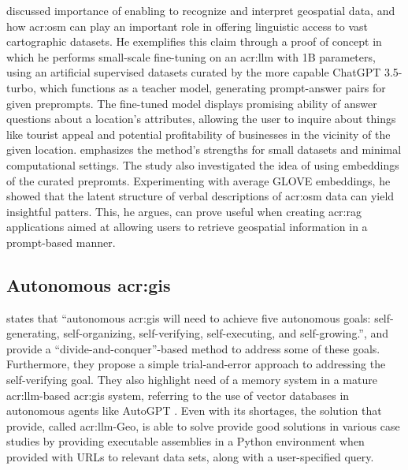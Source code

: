 \cite{unluChatmapLargeLanguage2023} discussed importance of enabling  to recognize and interpret geospatial data, and how \gls{acr:osm} can play an important role in offering  linguistic access to vast cartographic datasets. He exemplifies this claim through a proof of concept in which he performs small-scale fine-tuning on an \acrshort{acr:llm} with 1B parameters, using an artificial supervised datasets curated by the more capable ChatGPT 3.5-turbo, which functions as a teacher model, generating prompt-answer pairs for given preprompts. The fine-tuned model displays promising ability of answer questions about a location's attributes, allowing the user to inquire about things like tourist appeal and potential profitability of businesses in the vicinity of the given location. \citeauthor{unluChatmapLargeLanguage2023} emphasizes the method's strengths for small datasets and minimal computational settings. The study also investigated the idea of using embeddings of the curated prepromts. Experimenting with average GLOVE embeddings, he showed that the latent structure of verbal descriptions of \gls{acr:osm} data can yield insightful patters. This, he argues, can prove useful when creating \acrfull{acr:rag} applications aimed at allowing users to retrieve geospatial information in a prompt-based manner.

\subsection[]{Autonomous \acrshort{acr:gis}}

\cite{liAutonomousGISNextgeneration2023} states that “autonomous \acrshort{acr:gis} will need to achieve five autonomous goals: self-generating, self-organizing, self-verifying, self-executing, and self-growing.”, and provide a “divide-and-conquer”-based method to address some of these goals. Furthermore, they propose a simple trial-and-error approach to addressing the self-verifying goal. They also highlight need of a memory system in a mature \gls{acr:llm}-based \gls{acr:gis} system, referring to the use of vector databases in autonomous agents like AutoGPT \citep{richardAutoGPTHeartOpensource2023}. Even with its shortages, the solution that \citep{liAutonomousGISNextgeneration2023} provide, called \acrshort{acr:llm}-Geo, is able to solve provide good solutions in various case studies by providing executable assemblies in a Python environment when provided with URLs to relevant data sets, along with a user-specified query.

